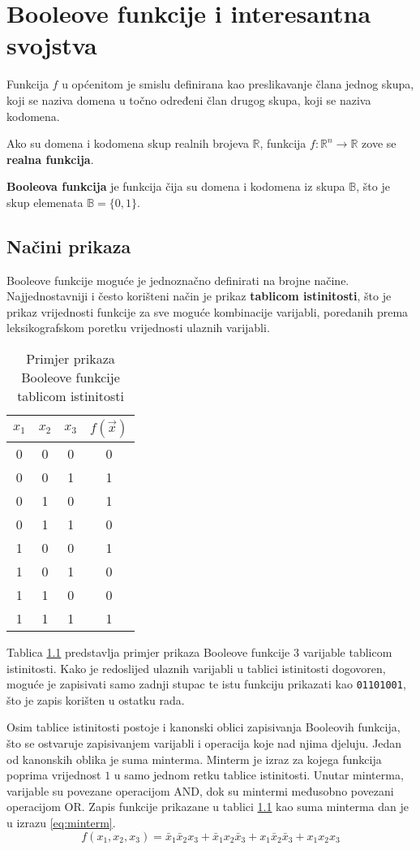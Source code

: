 \chapter{Booleove funkcije i interesantna svojstva}

Funkcija $f$ u općenitom je smislu definirana kao preslikavanje člana jednog skupa, koji se naziva domena u točno određeni član drugog skupa, koji se naziva kodomena.

Ako su domena i kodomena skup realnih brojeva $\mathds{R}$, funkcija $f : \mathds{R}^n \rightarrow \mathds{R}$ zove se \textbf{realna funkcija}.

\textbf{Booleova funkcija} je funkcija čija su domena i kodomena iz skupa $\mathds{B}$, što je skup elemenata $\mathds{B} = \{0, 1\}$.

\section{Načini prikaza}
Booleove funkcije moguće je jednoznačno definirati na brojne načine.
Najjednostavniji i često korišteni način je prikaz \textbf{tablicom istinitosti}, što je prikaz vrijednosti funkcije za sve moguće kombinacije varijabli, poredanih prema leksikografskom poretku vrijednosti ulaznih varijabli. 
\begin{table}
\centering
\begin{tabular}{ccc|c}
$x_1$ & $x_2$ & $x_3$ & $f(\vec{x})$ \\ \hline
 0 & 0 & 0 & 0 \\
 0 & 0 & 1 & 1 \\
 0 & 1 & 0 & 1 \\
 0 & 1 & 1 & 0 \\
 1 & 0 & 0 & 1 \\
 1 & 0 & 1 & 0 \\
 1 & 1 & 0 & 0 \\
 1 & 1 & 1 & 1
\end{tabular}
\caption{Primjer prikaza Booleove funkcije tablicom istinitosti}
\label{tbl:truth_table}
\end{table}
Tablica \ref{tbl:truth_table} predstavlja primjer prikaza Booleove funkcije $3$ varijable tablicom istinitosti.
Kako je redoslijed ulaznih varijabli u tablici istinitosti dogovoren, moguće je zapisivati samo zadnji stupac te istu funkciju prikazati kao \texttt{01101001}, što je zapis korišten u ostatku rada.

Osim tablice istinitosti postoje i kanonski oblici zapisivanja Booleovih funkcija, što se ostvaruje zapisivanjem varijabli i operacija koje nad njima djeluju.
Jedan od kanonskih oblika je suma minterma.
Minterm je izraz za kojega funkcija poprima vrijednost $1$ u samo jednom retku tablice istinitosti.
Unutar minterma, varijable su povezane operacijom AND, dok su mintermi međusobno povezani operacijom OR.
Zapis funkcije prikazane u tablici \ref{tbl:truth_table} kao suma minterma dan je u izrazu \eqref{eq:minterm}.
\begin{equation}\label{eq:minterm}
    f(x_1, x_2, x_3) = \bar{x}_1\bar{x}_2x_3 + \bar{x}_1x_2\bar{x}_3 + x_1\bar{x}_2\bar{x}_3 + x_1x_2x_3
\end{equation}

